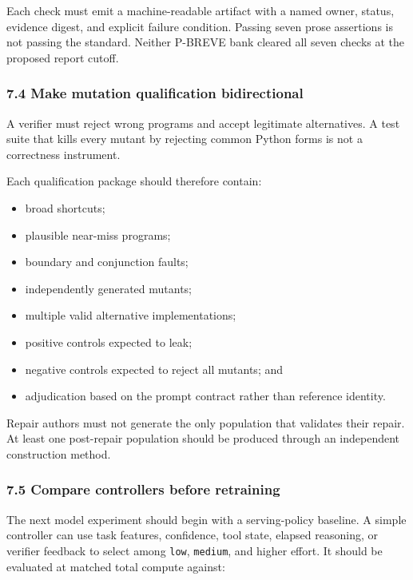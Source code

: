 \documentclass[
  9pt,
  letterpaper,
]{article}
\providecommand{\tightlist}{%
  \setlength{\itemsep}{0pt}\setlength{\parskip}{0pt}}
\begin{document}
Each check must emit a machine-readable artifact with a named owner,
status, evidence digest, and explicit failure condition. Passing seven
prose assertions is not passing the standard. Neither P-BREVE bank
cleared all seven checks at the proposed report cutoff.

\hypertarget{74-make-mutation-qualification-bidirectional}{%
\subsubsection{7.4 Make mutation qualification
bidirectional}\label{74-make-mutation-qualification-bidirectional}}

A verifier must reject wrong programs and accept legitimate
alternatives. A test suite that kills every mutant by rejecting common
Python forms is not a correctness instrument.

Each qualification package should therefore contain:

\begin{itemize}
\tightlist
\item
  broad shortcuts;
\item
  plausible near-miss programs;
\item
  boundary and conjunction faults;
\item
  independently generated mutants;
\item
  multiple valid alternative implementations;
\item
  positive controls expected to leak;
\item
  negative controls expected to reject all mutants; and
\item
  adjudication based on the prompt contract rather than reference
  identity.
\end{itemize}

Repair authors must not generate the only population that validates
their repair. At least one post-repair population should be produced
through an independent construction method.

\hypertarget{75-compare-controllers-before-retraining}{%
\subsubsection{7.5 Compare controllers before
retraining}\label{75-compare-controllers-before-retraining}}

The next model experiment should begin with a serving-policy baseline. A
simple controller can use task features, confidence, tool state, elapsed
reasoning, or verifier feedback to select among \texttt{low},
\texttt{medium}, and higher effort. It should be evaluated at matched
total compute against:
\end{document}

